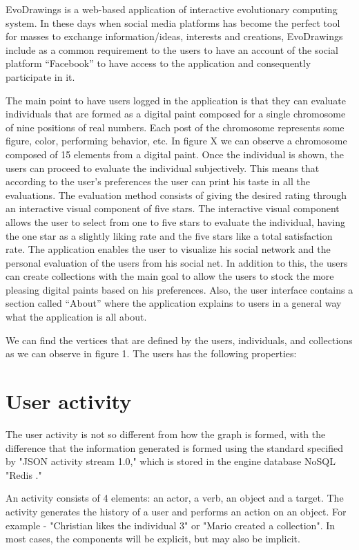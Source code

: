 EvoDrawings is a web-based application of interactive evolutionary computing system. In these days when social media platforms has become the perfect tool for masses to exchange information/ideas, interests and creations, EvoDrawings include as a common requirement to the users to have an account of the social platform “Facebook” to have access to the application and consequently participate in it.

The main point to have users logged in the application is that they can evaluate individuals that are formed as a digital paint composed for a single chromosome of nine positions of real numbers.
Each post of the chromosome represents some figure, color, performing behavior, etc. In figure X we can observe a chromosome composed of 15 elements from a digital paint. Once the individual is shown, the users can proceed to evaluate the individual subjectively. This means that according to the user's preferences the user can print his taste in all the evaluations.
The evaluation method consists of giving the desired rating through an interactive visual component of five stars. The interactive visual component allows the user to select from one to five stars to evaluate the individual, having the one star as a slightly liking rate and the five stars like a total satisfaction rate. 
The application enables the user to visualize his social network and the personal evaluation of the users from his social net. In addition to this, the users can create collections with the main goal to allow the users to stock the more pleasing digital paints based on his preferences. 
Also, the user interface contains a section called “About” where the application explains to users in a general way what the application is all about.



We can find the vertices that are defined by the users, individuals, and collections as we can observe in figure 1. The users has the following properties:

\section{User activity}
The user activity is not so different from how the graph is formed, with the difference that the information generated is formed using the standard specified by "JSON activity stream 1.0," which is stored in the engine database NoSQL "Redis ."

An activity consists of 4 elements: an actor, a verb, an object and a target. The activity generates the history of a user and performs an action on an object. For example - "Christian likes the individual 3" or "Mario created a collection". In most cases, the components will be explicit, but may also be implicit.

